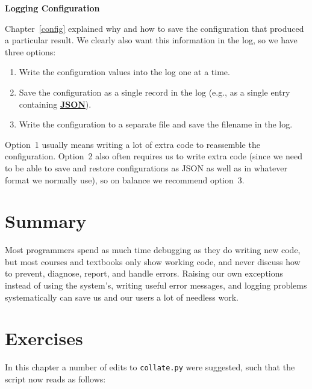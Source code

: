 \documentclass[
]{krantz}
\renewenvironment{quote}{\begin{VF}}{\end{VF}}
\newcommand{\gref}[2]{\hyperlink{#2}{\textbf{#1}}}
\begin{document}
\begin{quote}
\textbf{Logging Configuration}

Chapter~\ref{config} explained why and how
to save the configuration that produced a particular result.
We clearly also want this information in the log,
so we have three options:

\begin{enumerate}
\def\labelenumi{\arabic{enumi}.}
\item
  Write the configuration values into the log one at a time.
\item
  Save the configuration as a single record in the log
  (e.g., as a single entry containing \gref{JSON}{json}).
\item
  Write the configuration to a separate file
  and save the filename in the log.
\end{enumerate}

Option~1 usually means writing a lot of extra code to reassemble the configuration.
Option~2 also often requires us to write extra code
(since we need to be able to save and restore configurations as JSON
as well as in whatever format we normally use),
so on balance we recommend option~3.
\end{quote}

\hypertarget{errors-summary}{%
\section{Summary}\label{errors-summary}}

Most programmers spend as much time debugging as they do writing new code,
but most courses and textbooks only show working code,
and never discuss how to prevent, diagnose, report, and handle errors.
Raising our own exceptions instead of using the system's,
writing useful error messages,
and logging problems systematically
can save us and our users a lot of needless work.

\hypertarget{errors-exercises}{%
\section{Exercises}\label{errors-exercises}}

In this chapter a number of edits to \texttt{collate.py} were suggested,
such that the script now reads as follows:
\end{document}
